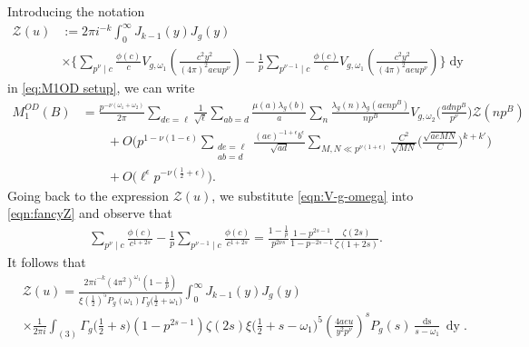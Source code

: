 \documentclass[12pt]{amsart}
\theoremstyle{plain}
\theoremstyle{definition}
\begin{document}
Introducing the notation 
    \begin{align}\label{eqn:fancyZ}
    \mathcal{Z}(u)
    &:= 2\pi i^{-k}
    \int_0^\infty J_{k-1}(y) J_g(y)\nonumber \\
    &\times \bigg\{\sum_{p^\nu \mid c} 
    \frac{\phi(c)}{c} V_{g, \omega_1}\left(\frac{c^2y^2}{(4\pi)^2 ae u p^\nu  }\right)
    - \frac{1}{p}\sum_{p^{\nu-1} \mid c}
    \frac{\phi(c)}{c} V_{g, \omega_1}\left(\frac{c^2y^2}{(4\pi)^2 ae u p^\nu }\right)
    \bigg\}
    \mathop{dy}
    \end{align}
in \eqref{eq:M1OD setup}, we can write
    \begin{align}\label{eq:M1OD} 
    M^{OD}_1(B)
   & =   
    \frac{p^{-\nu(\omega_1+\omega_2)}}{2\pi}
    \sum_{de=\ell}
    \frac{1}{\sqrt{\ell}}
    \sum_{ab=d} \frac{\mu(a)  \lambda_g(b)}{a}
    \sum_n  \frac{\lambda_g(n)  \lambda_g(aenp^B)}{np^B  }
    V_{g, \omega_2} \Big(\frac{adnp^B}{p^\nu }\Big)
    \mathcal{Z}(np^B)\nonumber 
    \\&\hspace{2em}+ O\bigg(p^{1-\nu(1-\epsilon)}
    \sum_{\substack{de=\ell\\ab=d}}  \frac{(ae)^{-1+\epsilon}b^{\epsilon}}{\sqrt{ad}}\sum_{M,N\ll p^{\nu(1+\epsilon)}}\frac{C^2}{\sqrt{MN}}\Big(\frac{\sqrt{aeMN}}{C}\Big)^{k+k'}\bigg)\nonumber
    \\&\hspace{2em}+O\Big(\ell^{\epsilon}p^{-\nu\left(\frac{1}{2}+\epsilon\right)}\Big).
    \end{align}
Going back to the expression $\mathcal{Z}(u)$, we substitute \eqref{eqn:V-g-omega} into \eqref{eqn:fancyZ} and observe that 
 \begin{align*}
    \sum_{p^\nu \mid c} 
    \frac{\phi(c)}{c^{1+2s}}
    -\frac{1}{p} \sum_{p^{\nu-1} \mid c}
      \frac{\phi(c)}{c^{1+2s}}
      =\frac{1-\frac1{p}}{p^{2\nu s}} \frac{1-p^{2s-1}}{1-p^{-2s-1}}  \frac{\zeta(2s)}{ \zeta(1+2s) } .
    \end{align*}
It follows that
    \begin{align*}
    &\mathcal{Z}(u)= 
     \frac{2\pi i^{-k} (4\pi^2)^{\omega_1}(1-\frac1{p})}{\xi(\frac12)^5 P_g(\omega_1) \Gamma_g\big(\frac12+\omega_1\big)}
    \int_0^\infty J_{k-1}(y) J_g(y) 
     \\
    &\times \frac{1}{2\pi i}  \int_{(3)} 
    \Gamma_g\Big(\frac12+s\Big) (1-p^{2s-1}) \zeta(2s)
 \xi\Big(\frac12+s-\omega_1\Big)^5 \left(\frac{4aeu}{y^2p^\nu}\right)^s
    P_g(s)
    \frac{\mathop{ds}}{s-\omega_1}
    \mathop{dy}.
    \end{align*}
\end{document}
